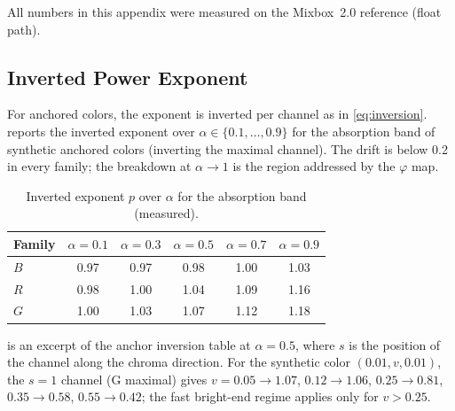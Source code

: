 All numbers in this appendix were measured on the Mixbox~2.0 reference (float path).

\subsection{Inverted Power Exponent}
For anchored colors, the exponent is inverted per channel as in \cref{eq:inversion}.  reports the inverted exponent over $\alpha\in\{0.1,\dots,0.9\}$ for the absorption band of synthetic anchored colors (inverting the maximal channel). The drift is below 0.2 in every family; the breakdown at $\alpha\to1$ is the region addressed by the $\varphi$ map.

\begin{table}[t]
\centering
\small
\caption{Inverted exponent $p$ over $\alpha$ for the absorption band (measured).}
\label{tab:d1}
\begin{tabular}{lccccc}
\toprule
Family & $\alpha=0.1$ & $\alpha=0.3$ & $\alpha=0.5$ & $\alpha=0.7$ & $\alpha=0.9$ \\
\midrule
$B$ & 0.97 & 0.97 & 0.98 & 1.00 & 1.03 \\
$R$ & 0.98 & 1.00 & 1.04 & 1.09 & 1.16 \\
$G$ & 1.00 & 1.03 & 1.07 & 1.12 & 1.18 \\
\bottomrule
\end{tabular}
\end{table}

 is an excerpt of the anchor inversion table at $\alpha=0.5$, where $s$ is the position of the channel along the chroma direction. For the synthetic color $(0.01,v,0.01)$, the $s=1$ channel (G maximal) gives $v=0.05\rightarrow1.07$, $0.12\rightarrow1.06$, $0.25\rightarrow0.81$, $0.35\rightarrow0.58$, $0.55\rightarrow0.42$; the fast bright-end regime applies only for $v>0.25$.

